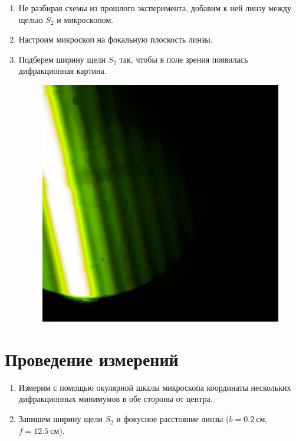 \documentclass[14pt, a4paper]{report}
\begin{document}
\begin{enumerate}

\item Не разбирая схемы из прошлого эксперимента, добавим к ней линзу между щелью $S_2$ и микроскопом.

\item Настроим микроскоп на фокальную плоскость линзы.

\item Подберем ширину щели $S_2$ так, чтобы в поле зрения появилась дифракционная картина.

\begin{figure}[H]
\centering
\includegraphics[scale=0.2]{../images/431_4}
\end{figure}

\end{enumerate}

\section{Проведение измерений}

\begin{enumerate}

\item Измерим с помощью окулярной шкалы микроскопа координаты нескольких дифракционных минимумов в обе стороны от центра.

\item Запишем ширину щели $S_2$ и фокусное расстояние линзы ($b=0.2\ см$, $f=12.5\ см$).

\end{enumerate}
\end{document}
